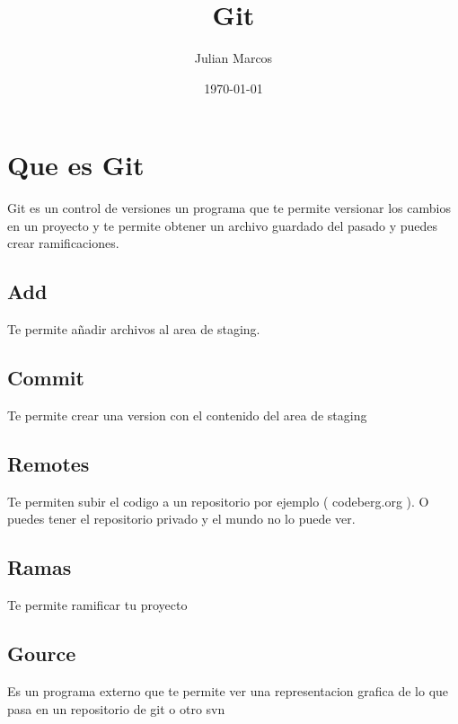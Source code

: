 \documentclass[11pt]{article}
\author{Julian Marcos}
\date{\today}
\title{Git}
\begin{document}
\maketitle
\tableofcontents


\section{Que es Git}
\label{sec:org1c820b9}
Git es un control de versiones un programa que te permite versionar los cambios en un proyecto y te permite obtener un archivo guardado del pasado y puedes crear ramificaciones.
\subsection{Add}
\label{sec:orgce634a5}
Te permite añadir archivos al area de staging.
\subsection{Commit}
\label{sec:org2d566e1}
Te permite crear una version con el contenido del area de staging
\subsection{Remotes}
\label{sec:org097e295}
Te permiten subir el codigo a un repositorio por ejemplo ( codeberg.org ).
O puedes tener el repositorio privado y el mundo no lo puede ver.
\subsection{Ramas}
\label{sec:org2866b1f}
Te permite ramificar tu proyecto
\subsection{Gource}
\label{sec:org7867655}
Es un programa externo que te permite ver una representacion grafica de lo que pasa en un repositorio de git o otro svn
\end{document}
